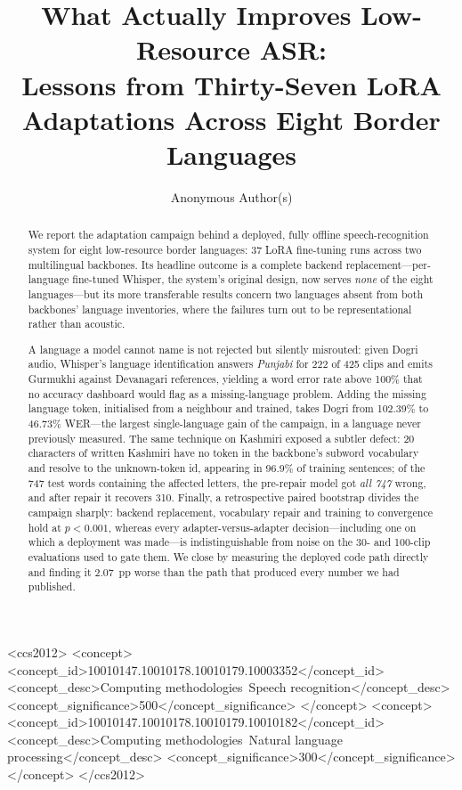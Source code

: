 \documentclass[sigconf,anonymous,review]{acmart}
\begin{document}
\title{What Actually Improves Low-Resource ASR:\\
Lessons from Thirty-Seven LoRA Adaptations Across Eight Border Languages}

\author{Anonymous Author(s)}

\begin{abstract}
We report the adaptation campaign behind a deployed, fully offline
speech-recognition system for eight low-resource border languages: 37 LoRA
fine-tuning runs across two multilingual backbones. Its headline outcome is a
complete backend replacement---per-language fine-tuned Whisper, the system's
original design, now serves \emph{none} of the eight languages---but its more
transferable results concern two languages absent from both backbones' language
inventories, where the failures turn out to be representational rather than
acoustic.

A language a model cannot name is not rejected but silently misrouted: given
Dogri audio, Whisper's language identification answers \emph{Punjabi} for 222 of
425 clips and emits Gurmukhi against Devanagari references, yielding a word
error rate above 100\% that no accuracy dashboard would flag as a
missing-language problem. Adding the missing language token, initialised from a
neighbour and trained, takes Dogri from 102.39\% to 46.73\% WER---the largest
single-language gain of the campaign, in a language never previously measured.
The same technique on Kashmiri exposed a subtler defect: 20 characters of
written Kashmiri have no token in the backbone's subword vocabulary and resolve
to the unknown-token id, appearing in 96.9\% of training sentences; of the 747
test words containing the affected letters, the pre-repair model got \emph{all
747} wrong, and after repair it recovers 310. Finally, a retrospective
paired bootstrap divides the campaign sharply: backend replacement, vocabulary
repair and training to convergence hold at $p<0.001$, whereas every
adapter-versus-adapter decision---including one on which a deployment was
made---is indistinguishable from noise on the 30- and 100-clip evaluations used
to gate them. We close by measuring the deployed code path directly and finding
it 2.07~pp worse than the path that produced every number we had published.
\end{abstract}

\begin{CCSXML}
<ccs2012>
<concept>
<concept_id>10010147.10010178.10010179.10003352</concept_id>
<concept_desc>Computing methodologies~Speech recognition</concept_desc>
<concept_significance>500</concept_significance>
</concept>
<concept>
<concept_id>10010147.10010178.10010179.10010182</concept_id>
<concept_desc>Computing methodologies~Natural language processing</concept_desc>
<concept_significance>300</concept_significance>
</concept>
</ccs2012>
\end{CCSXML}
\end{document}
